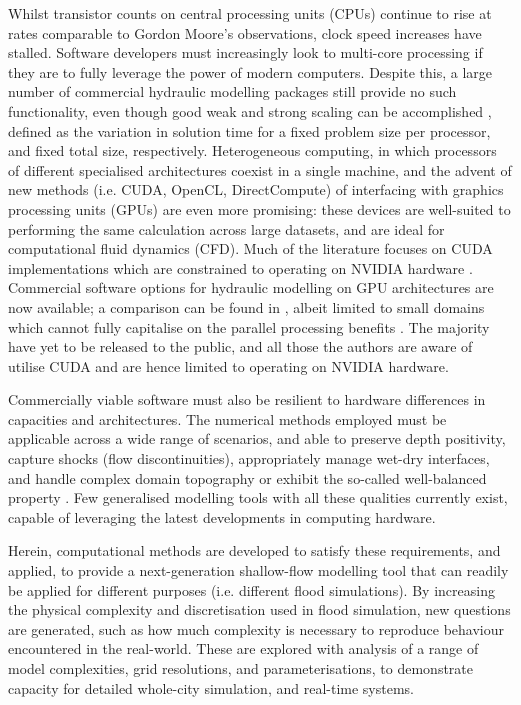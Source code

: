 Whilst transistor counts on central processing units (CPUs) continue to rise at rates comparable to Gordon Moore's observations, clock speed increases have stalled. Software developers must increasingly look to multi-core processing if they are to fully leverage the power of modern computers. Despite this, a large number of commercial hydraulic modelling packages still provide no such functionality, even though good weak and strong scaling can be accomplished \citep{Sanders2010,Kalyanapu2011,Saetra2012}, defined as the variation in solution time for a fixed problem size per processor, and fixed total size, respectively. Heterogeneous computing, in which processors of different specialised architectures coexist in a single machine, and the advent of new methods (i.e. CUDA, OpenCL, DirectCompute) of interfacing with graphics processing units (GPUs) are even more promising: these devices are well-suited to performing the same calculation across large datasets, and are ideal for computational fluid dynamics (CFD). Much of the literature focuses on CUDA implementations which are constrained to operating on NVIDIA hardware \citep[e.g.][]{Kuo2011,Saetra2012}. Commercial software options for hydraulic modelling on GPU architectures are now available; a comparison can be found in \citet{Pender2013}, albeit limited to small domains which cannot fully capitalise on the parallel processing benefits \citep{Saetra2012}. The majority have yet to be released to the public, and all those the authors are aware of utilise CUDA and are hence limited to operating on NVIDIA hardware.

Commercially viable software must also be resilient to hardware differences in capacities and architectures. The numerical methods employed must be applicable across a wide range of scenarios, and able to preserve depth positivity, capture shocks (flow discontinuities), appropriately manage wet-dry interfaces, and handle complex domain topography or exhibit the so-called well-balanced property \citep{Xing2010,Murillo2010}. Few generalised modelling tools with all these qualities currently exist, capable of leveraging the latest developments in computing hardware. 

Herein, computational methods are developed to satisfy these requirements, and applied, to provide a next-generation shallow-flow modelling tool that can readily be applied for different purposes (i.e. different flood simulations). By increasing the physical complexity and discretisation used in flood simulation, new questions are generated, such as how much complexity is necessary to reproduce behaviour encountered in the real-world. These are explored with analysis of a range of model complexities, grid resolutions, and parameterisations, to demonstrate capacity for detailed whole-city simulation, and real-time systems.

